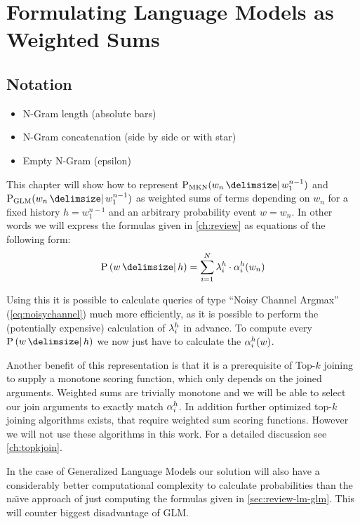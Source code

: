 \chapter{Formulating Language Models as Weighted Sums}
\label{ch:weightedsum}


\section{Notation}

\begin{itemize}
  \item N-Gram length (absolute bars)
  \item N-Gram concatenation (side by side or with star)
  \item Empty N-Gram (epsilon)
\end{itemize}


This chapter will show how to represent  $\ProbMKN{w_n}{w_1^{n-1}}$ and
$\ProbGLM{w_n}{w_1^{n-1}}$ as weighted sums of terms depending on $w_n$ for a
fixed history $h = w_1^{n-1}$ and an  arbitrary probability event $w = w_n$.
In other words we will express the formulas given in \cref{ch:review} as
equations of the following form:
\begin{equation}
  \label{eq:weightedsum}
  \Prob{w}{h} = \sum_{i = 1}^{N} \SumWeight_i^h \cdot \SumArg_i^h(w_n)
\end{equation}

\begin{draft}
Using this it is possible to calculate queries of type ``Noisy Channel Argmax''
(\cref{eq:noisychannel}) much more efficiently, as it is possible to perform the
(potentially expensive) calculation of $\lambda_i^h$ in advance.
To compute every $\Prob{w}{h}$ we now just have to calculate the
$\alpha_i^h(w)$.

Another benefit of this representation is that it is a prerequisite of Top-$k$
joining to supply a monotone scoring function, which only depends on the
joined arguments.
Weighted sums are trivially monotone  and we will be able to
select our join arguments to exactly match $\alpha_i^h$.
In addition further optimized top-$k$ joining algorithms exists, that require
weighted sum scoring functions.
However we will not use these algorithms in this work.
For a detailed discussion see \cref{ch:topkjoin}.

In the case of Generalized Language Models our solution will also have a
considerably better computational complexity to calculate probabilities than the
na{\"\i}ve  approach of just computing
the formulas given in
\cref{sec:review-lm-glm}.
This will counter biggest disadvantage of GLM.
\end{draft}

